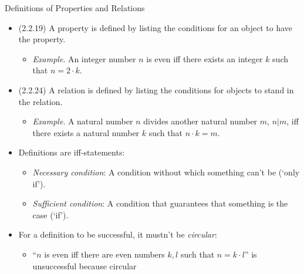 \begin{frame}{Definitions of Properties and Relations}

	\begin{itemize}
	
		\item (2.2.19) A property is defined by listing the conditions for an object to have the property.
		
		\begin{itemize}
		
			\item \emph{Example}. An integer number $n$ is even iff there exists an integer $k$ such that $n=2\cdot k$.
	
		\end{itemize}
		
		\item (2.2.24) A relation is defined by listing the conditions for objects to stand in the relation.
		
		\begin{itemize}
		
			\item \emph{Example}. A natural number $n$ divides another natural number $m$, $n|m$, iff there exists a natural number $k$ such that $n\cdot k=m$.
	
		\end{itemize}
				
		\item Definitions are iff-statements:
		
		\begin{itemize}
		
			\item \emph{Necessary condition}: A condition without which something can't be (`only if').
			
			\item \emph{Sufficient condition}: A condition that guarantees that something is the case (`if').
		
		\end{itemize}
		
		\item For a definition to be successful, it mustn't be \emph{circular}:
		
		\begin{itemize}
		
			\item ``$n$ is even iff there are even numbers $k,l$ such that $n=k\cdot l$'' is unsuccessful because circular 
		
		\end{itemize}
	
	\end{itemize}

\end{frame}



